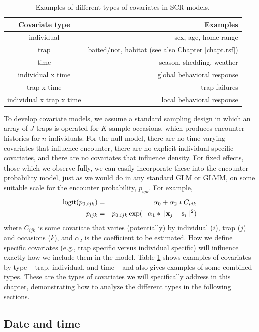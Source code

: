 \begin{table}[ht]
\centering
\caption{Examples of different types of covariates in SCR models.}
\begin{tabular}{cr}
\hline \hline
Covariate type & Examples \\
\hline
individual & sex, age, home range \\
trap  &  baited/not, habitat (see also Chapter \ref{chapt.rsf}) \\
time  &  season, shedding,  weather  \\
individual x time    &    global behavioral response \\
trap x time     &       trap failures  \\ 
individual x trap x time  &   local behavioral response  \\ \hline
\end{tabular}
\label{covariates.tab.covclass}
\end{table}


To develop covariate models, we assume a standard sampling design in
which an array of $J$ traps is operated for $K$ sample occasions,
which produces encounter histories for $n$ individuals.  For the null
model, there are no time-varying covariates that influence encounter,
there are no explicit individual-specific covariates, and there are no
covariates that influence density.  For fixed effects, those which we
observe fully, we can easily incorporate these into the encounter
probability model, just as we would do in any standard GLM or GLMM, on
some suitable scale for the encounter probability, $p_{ijk}$. For
example,
\begin{eqnarray*}
\mbox{logit}(p_{0,ijk}) &=& \alpha_0 + \alpha_2*C_{ijk} \\
p_{ijk} &=& p_{0,ijk} \exp(- \alpha_1*||{\bf x}_{j}-{\bf s}_{i}||^2) 
\end{eqnarray*}
where $C_{ijk}$ is some covariate that varies (potentially) by
individual ($i$), trap ($j$) and occasions ($k$), and
$\alpha_2$ is the coefficient to be estimated.
 How we define specific covariates (e.g., trap specific
versus individual specific) will influence exactly how we include them
in the model. Table \ref{covariates.tab.covclass} shows examples of covariates by
type -- trap, individual, and time -- and also gives examples of some combined types.
These are the types of covariates we will specifically address in this chapter, demonstrating
how to analyze the different
 types in the following sections.  

\subsection{Date and time}

